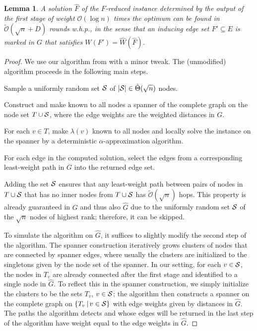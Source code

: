 \documentclass[letterpaper,11pt]{article}
\newtheorem{lemma}[theorem]{Lemma}
\newcommand{\BO}{\mathcal{O}}
\newcommand{\sO}{\tilde{\mathcal{O}}}
\newcommand{\Comp}{\lambda}
\begin{document}
\begin{lemma}\label{lemma:stage2_solve}
A solution $\hat{F}$ of the $F$-reduced instance determined by the output of the
first stage of weight $\BO(\log n)$ times the optimum can be found in
$\sO(\sqrt{n}+D)$ rounds w.h.p., in the sense that an inducing edge set
$F'\subseteq E$ is marked in $G$ that satisfies $W(F')=\hat{W}(\hat{F})$.
\end{lemma}
\begin{proof}
We use our algorithm from \cite{LenzenP13} with a minor tweak. The (unmodified)
algorithm proceeds in the following main steps.
\begin{compactitem}
\item Sample a uniformly random set ${\cal S}$ of
$|{\cal S}|\in \tilde{\Theta}(\sqrt{n})$ nodes.
\item Construct and make known to all nodes a spanner of the complete graph on
the node set $T\cup {\cal S}$, where the edge weights are the weighted distances
in $G$.
\item For each $v\in T$, make $\Comp(v)$ known to all nodes and locally solve
the instance on the spanner by a deterministic $\alpha$-approximation algorithm.
\item For each edge in the computed solution, select the edges from a
corresponding least-weight path in $G$ into the returned edge set.
\end{compactitem}
Adding the set ${\cal S}$ ensures that any least-weight path between pairs of
nodes in $T\cup {\cal S}$ that has no inner nodes from $T\cup {\cal S}$ has
$\sO(\sqrt{n})$ hops. This property is already guaranteed in $G$ and
thus also $\hat{G}$ due to the uniformly random set ${\cal S}$ of the $\sqrt{n}$
nodes of highest rank; therefore, it can be skipped.

To simulate the algorithm on $\hat{G}$, it suffices to slightly modify the
second step of the algorithm. The spanner construction iteratively grows
clusters of nodes that are connected by spanner edges, where usually the
clusters are initialized to the singletons given by the node set of the spanner.
In our setting, for each $v\in {\cal S}$, the nodes in $T_v$ are already
connected after the first stage and identified to a single node in $\hat{G}$.
To reflect this in the spanner construction, we simply initialize the clusters
to be the sets $T_v$, $v\in {\cal S}$; the algorithm then constructs a spanner
on the complete graph on $\{T_v\,|\,v\in {\cal S}\}$ with edge weights given by
distances in $\hat{G}$. The paths the algorithm detects and whose edges will be
returned in the last step of the algorithm have weight equal to the edge weights
in $\hat{G}$.


\end{proof}
\end{document}
